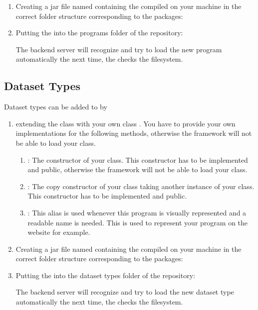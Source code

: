\begin{enumerate}
\begin{enumerate}
\begin{verbatim}
			\end{verbatim}		
		\end{enumerate}
			\item Creating a jar file named  containing the  compiled on your machine in the correct folder structure corresponding to the packages:
			
			\item Putting the  into the programs folder of the repository:
			
			\highlight{\repoprograms}
			
			The backend server will recognize and try to load the new program automatically the next time, the  checks the filesystem.
			
	\end{enumerate}
	\subsection{Dataset Types}\label{subsec_extend_datasettypes}
	Dataset types can be added to \clusteval by
	\begin{enumerate}
		\item  extending the class  with your own class . You have to provide your own implementations for the following methods, otherwise the framework will not be able to load your class.
		\begin{enumerate}
			\item {}: The constructor of your class. This constructor has to be implemented and public, otherwise the framework will not be able to load your class.
			\item {}: The copy constructor of your class taking another instance of your class. This constructor has to be implemented and public.
			\item {}: This alias is used whenever this program is visually represented and a readable name is needed. This is used to represent your program on the website for example.
		\end{enumerate}
			\item Creating a jar file named  containing the  compiled on your machine in the correct folder structure corresponding to the packages:
			
			\item Putting the  into the dataset types folder of the repository:
			
			\highlight{\reposuppdstypes}
			
			The backend server will recognize and try to load the new dataset type automatically the next time, the  checks the filesystem.
	\end{enumerate}
